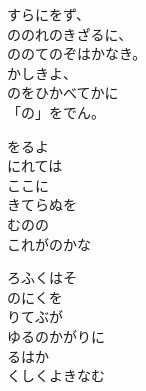 \documentclass[10pt,b5j]{tarticle} %
\begin{document}
\vspace{1.5em} %
\newcommand{\linespace}{0.5em} %
\newcommand{\blocksize}{0.5\hsize} %
\begin{enumerate} %
    \begin{minipage}[c]{\blocksize}
    
        \vspace{\linespace}
        \item
        すらにをず、\\
        ののれのきざるに、\\
        ののてのぞはかなき。\\
        かしきよ、\\
        のをひかべてかに\\
        「の」をでん。
        
        \vspace{\linespace}
        \item
        をるよ\\
        にれては\\
        ここに\\
        きてらぬを\\
        むのの\\
        これがのかな
        
        \vspace{\linespace}
        \item
        ろふくはそ\\
        のにくを\\
        りてぶが\\
        ゆるのかがりに\\
        るはか\\
        くしくよきなむ
        

\end{minipage}
\end{enumerate}
\end{document}
